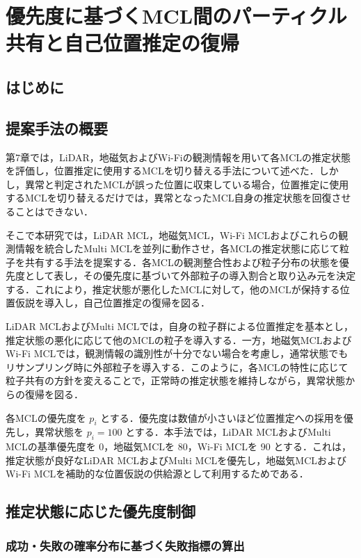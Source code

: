 \chapter{優先度に基づくMCL間のパーティクル共有と自己位置推定の復帰}
\label{cha:simulation_experiments}
\graphicspath{{figures/06}}
\section{はじめに}

\section{提案手法の概要}

第7章では，LiDAR，地磁気およびWi-Fiの観測情報を用いて各MCLの推定状態を評価し，位置推定に使用するMCLを切り替える手法について述べた．しかし，異常と判定されたMCLが誤った位置に収束している場合，位置推定に使用するMCLを切り替えるだけでは，異常となったMCL自身の推定状態を回復させることはできない．

そこで本研究では，LiDAR MCL，地磁気MCL，Wi-Fi MCLおよびこれらの観測情報を統合したMulti MCLを並列に動作させ，各MCLの推定状態に応じて粒子を共有する手法を提案する．各MCLの観測整合性および粒子分布の状態を優先度として表し，その優先度に基づいて外部粒子の導入割合と取り込み元を決定する．これにより，推定状態が悪化したMCLに対して，他のMCLが保持する位置仮説を導入し，自己位置推定の復帰を図る．

LiDAR MCLおよびMulti MCLでは，自身の粒子群による位置推定を基本とし，推定状態の悪化に応じて他のMCLの粒子を導入する．一方，地磁気MCLおよびWi-Fi MCLでは，観測情報の識別性が十分でない場合を考慮し，通常状態でもリサンプリング時に外部粒子を導入する．このように，各MCLの特性に応じて粒子共有の方針を変えることで，正常時の推定状態を維持しながら，異常状態からの復帰を図る．

各MCLの優先度を $p_i$ とする．優先度は数値が小さいほど位置推定への採用を優先し，異常状態を $p_i=100$ とする．本手法では，LiDAR MCLおよびMulti MCLの基準優先度を $0$，地磁気MCLを $80$，Wi-Fi MCLを $90$ とする．これは，推定状態が良好なLiDAR MCLおよびMulti MCLを優先し，地磁気MCLおよびWi-Fi MCLを補助的な位置仮説の供給源として利用するためである．


\section{推定状態に応じた優先度制御}

\subsection{成功・失敗の確率分布に基づく失敗指標の算出}


